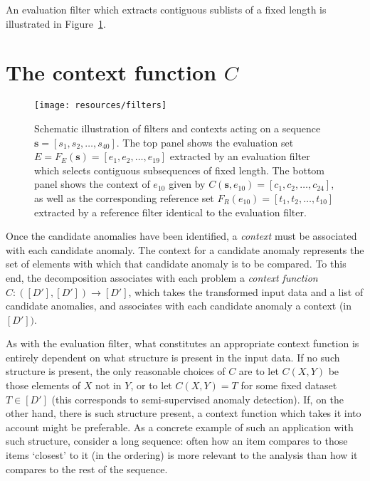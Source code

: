 An evaluation filter which extracts contiguous sublists of a fixed length is illustrated in Figure~\ref{fig:filters}.

\section{The context function $C$}

\begin{figure}[htb]
    \begin{center}
        \texttt{[image: resources/filters]}
    \end{center}
    \caption{{\small Schematic illustration of filters and contexts acting on a sequence $\mathbf{s} = [s_1, s_2, \dots, s_{40}]$. The top panel shows the evaluation set $E = F_E(\mathbf{s}) = [e_1, e_2, \dots, e_{19}]$ extracted by an evaluation filter which selects contiguous subsequences of fixed length. The bottom panel shows the context of $e_{10}$ given by $C(\mathbf{s}, e_{10}) = [c_1, c_2, \dots, c_{24}]$, as well as the corresponding reference set $F_R(e_{10}) = [t_1, t_2, \dots, t_{10}]$ extracted by a reference filter identical to the evaluation filter.}}
\label{fig:filters}
\end{figure}

Once the candidate anomalies have been identified, a \emph{context} must be associated with each candidate anomaly. The context for a candidate anomaly represents the set of elements with which that candidate anomaly is to be compared. To this end, the decomposition associates with each problem a \emph{context function} $C: ([D'], [D']) \rightarrow [D']$, which takes the transformed input data and a list of candidate anomalies, and associates with each candidate anomaly a context (in $[D'])$.

As with the evaluation filter, what constitutes an appropriate context function is entirely dependent on what structure is present in the input data. If no such structure is present, the only reasonable choices of $C$ are to let $C(X, Y)$ be those elements of $X$ not in $Y$, or to let $C(X, Y) = T$ for some fixed dataset $T \in [D']$ (this corresponds to semi-supervised anomaly detection). If, on the other hand, there is such structure present, a context function which takes it into account might be preferable. As a concrete example of such an application with such structure, consider a long sequence: often how an item compares to those items `closest' to it (in the ordering) is more relevant to the analysis than how it compares to the rest of the sequence.

